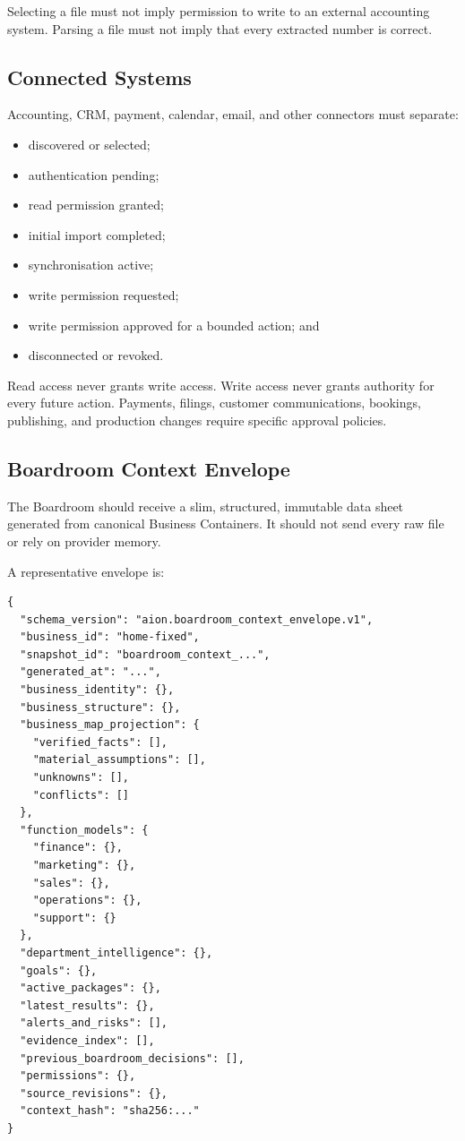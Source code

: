 Selecting a file must not imply permission to write to an external accounting
system. Parsing a file must not imply that every extracted number is correct.

\subsection{Connected Systems}

Accounting, CRM, payment, calendar, email, and other connectors must separate:

\begin{itemize}
  \item discovered or selected;
  \item authentication pending;
  \item read permission granted;
  \item initial import completed;
  \item synchronisation active;
  \item write permission requested;
  \item write permission approved for a bounded action; and
  \item disconnected or revoked.
\end{itemize}

Read access never grants write access. Write access never grants authority for
every future action. Payments, filings, customer communications, bookings,
publishing, and production changes require specific approval policies.

\subsection{Boardroom Context Envelope}

The Boardroom should receive a slim, structured, immutable data sheet generated
from canonical Business Containers. It should not send every raw file or rely on
provider memory.

A representative envelope is:

\begin{verbatim}
{
  "schema_version": "aion.boardroom_context_envelope.v1",
  "business_id": "home-fixed",
  "snapshot_id": "boardroom_context_...",
  "generated_at": "...",
  "business_identity": {},
  "business_structure": {},
  "business_map_projection": {
    "verified_facts": [],
    "material_assumptions": [],
    "unknowns": [],
    "conflicts": []
  },
  "function_models": {
    "finance": {},
    "marketing": {},
    "sales": {},
    "operations": {},
    "support": {}
  },
  "department_intelligence": {},
  "goals": {},
  "active_packages": {},
  "latest_results": {},
  "alerts_and_risks": [],
  "evidence_index": [],
  "previous_boardroom_decisions": [],
  "permissions": {},
  "source_revisions": {},
  "context_hash": "sha256:..."
}
\end{verbatim}

